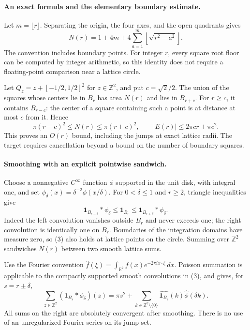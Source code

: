 \documentclass[11pt]{article}
\begin{document}
\paragraph{An exact formula and the elementary boundary estimate.}
Let $m=\lfloor r\rfloor$. Separating the origin, the four axes, and
the open quadrants gives
\[
 N(r)=1+4m+4\sum_{a=1}^{m}\left\lfloor\sqrt{r^2-a^2}\right\rfloor.
                                                               \tag{1}
\]
The convention includes boundary points. For integer $r$, every square
root floor can be computed by integer arithmetic, so this identity does
not require a floating-point comparison near a lattice circle.

Let $Q_z=z+[-1/2,1/2]^2$ for $z\in\mathbb Z^2$, and put
$c=\sqrt2/2$. The union of the squares whose centers lie in $B_r$
has area $N(r)$ and lies in $B_{r+c}$. For $r\ge c$, it contains
$B_{r-c}$: the center of a square containing such a point is at distance
at most $c$ from it. Hence
\[
 \pi(r-c)^2\le N(r)\le\pi(r+c)^2,
 \qquad |E(r)|\le2\pi cr+\pi c^2.                       \tag{2}
\]
This proves an $O(r)$ bound, including the jumps at exact lattice radii.
The target requires cancellation beyond a bound on the number of
boundary squares.

\paragraph{Smoothing with an explicit pointwise sandwich.}
Choose a nonnegative $C^\infty$ function $\phi$ supported in the unit
disk, with integral one, and set
$\phi_\delta(x)=\delta^{-2}\phi(x/\delta)$.
For $0<\delta\le1$ and $r\ge2$, triangle inequalities give
\[
 {\boldsymbol1}_{B_{r-\delta}}*\phi_\delta
       \le {\boldsymbol1}_{B_r}
       \le {\boldsymbol1}_{B_{r+\delta}}*\phi_\delta.      \tag{3}
\]
Indeed the left convolution vanishes outside $B_r$ and never exceeds
one; the right convolution is identically one on $B_r$. Boundaries of
the integration domains have measure zero, so (3) also holds at lattice
points on the circle. Summing over $\mathbb Z^2$ sandwiches $N(r)$
between two smooth lattice sums.

Use the Fourier convention
$\widehat f(\xi)=\int_{\mathbb R^2}f(x)e^{-2\pi i x\cdot\xi}\,dx$.
Poisson summation is applicable to the compactly supported smooth
convolutions in (3), and gives, for $s=r\pm\delta$,
\[
 \sum_{z\in\mathbb Z^2}({\boldsymbol1}_{B_s}*\phi_\delta)(z)
 =\pi s^2+\sum_{k\in\mathbb Z^2\setminus\{0\}}
       \widehat{{\boldsymbol1}_{B_s}}(k)\widehat\phi(\delta k).
                                                               \tag{4}
\]
All sums on the right are absolutely convergent after smoothing.
There is no use of an unregularized Fourier series on its jump set.
\end{document}
